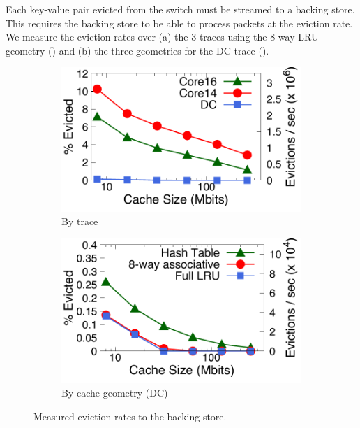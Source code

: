  Each key-value pair evicted from the switch must be streamed to a backing store.
This requires the backing store to be able to process packets at the eviction rate. We measure the eviction rates over (a) the 3 traces using the 8-way LRU geometry () and (b) the three geometries for the DC trace ().
\begin{figure}[ht]
\centering
\vspace{-0.1in}
\begin{subfigure}[t]{0.48\columnwidth}
\raggedright
\includegraphics[width=\linewidth]{pq_eviction-rate-alltraces.pdf}
\caption{By trace}
\label{fig:eviction-traces}
\end{subfigure}
\begin{subfigure}[t]{0.48\columnwidth}
\raggedleft
\includegraphics[width=\linewidth]{pq_eviction-rate-geo-dc.pdf}
\caption{By cache geometry (DC)}
\label{fig:eviction-geo}
\end{subfigure}
\caption{Measured eviction rates to the backing store.}
\end{figure}

